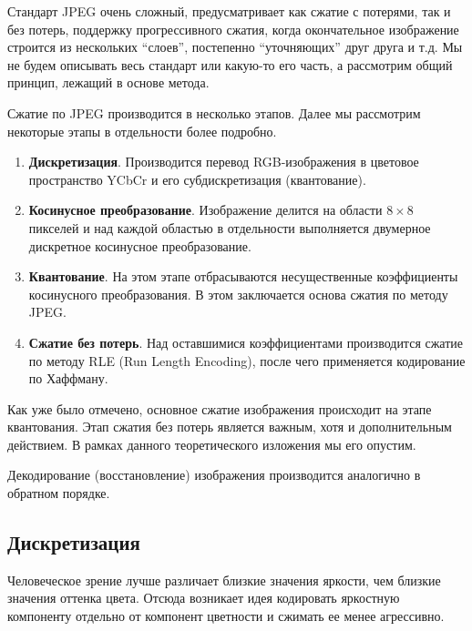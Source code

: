 \documentclass[12pt,a4paper]{article}
\begin{document}
            Стандарт JPEG очень сложный, предусматривает как сжатие с потерями, так и без потерь, поддержку прогрессивного сжатия, когда окончательное изображение строится из нескольких \enquote{слоев}, постепенно \enquote{уточняющих} друг друга и т.д. Мы не будем описывать весь стандарт или какую-то его часть, а рассмотрим общий принцип, лежащий в основе метода.

            Сжатие по JPEG производится в несколько этапов. Далее мы рассмотрим некоторые этапы в отдельности более подробно.
            \begin{enumerate}
                \item \textbf{Дискретизация}. Производится перевод RGB-изображения в цветовое пространство YCbCr и его субдискретизация (квантование).
                \item \textbf{Косинусное преобразование}. Изображение делится на области $8\times 8$ пикселей и над каждой областью в отдельности выполняется двумерное дискретное косинусное преобразование.
                \item \textbf{Квантование}. На этом этапе отбрасываются несущественные коэффициенты косинусного преобразования. В этом заключается основа сжатия по методу JPEG.
                \item \textbf{Сжатие без потерь}. Над оставшимися коэффициентами производится сжатие по методу RLE (Run Length Encoding), после чего применяется кодирование по Хаффману.
            \end{enumerate}
            Как уже было отмечено, основное сжатие изображения происходит на этапе квантования. Этап сжатия без потерь является важным, хотя и дополнительным действием. В рамках данного теоретического изложения мы его опустим.

            Декодирование (восстановление) изображения производится аналогично в обратном порядке.


        \subsection{Дискретизация}

            Человеческое зрение лучше различает близкие значения яркости, чем близкие значения оттенка цвета. Отсюда возникает идея кодировать яркостную компоненту отдельно от компонент цветности и сжимать ее менее агрессивно.
\end{document}
